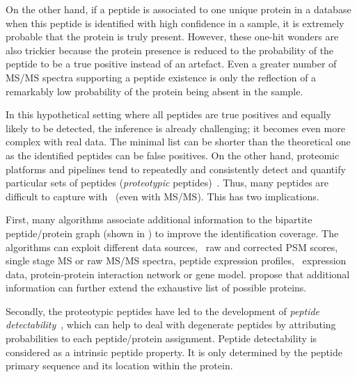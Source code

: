 On the other hand,
if a peptide is associated to one unique protein in a database
when this peptide is identified with high confidence in a sample,
it is extremely probable that the protein is truly present.
However, these one-hit wonders are also trickier because
the protein presence is reduced to
the probability of the peptide to be a true positive instead of an artefact.
Even a greater number of \gls{MS/MS} spectra supporting a peptide existence
is only the reflection of a remarkably low probability of the protein being absent
in the sample.\mybr\

In this hypothetical setting
where all peptides are true positives and equally likely to be detected,
the inference is already challenging;
it becomes even more complex with real data.
The minimal list can be shorter than the theoretical one as
the identified peptides can be false positives.
On the other hand,
proteomic platforms and pipelines tend to
repeatedly and consistently detect and quantify particular sets of peptides
(\emph{proteotypic} peptides)~.
Thus, many peptides are difficult to capture with \ms\ (even with \gls{MS/MS}).
This has two implications.\mybr\

First, many algorithms associate additional information
to the bipartite peptide/protein graph (shown in )
to improve the identification coverage.
The algorithms can exploit different data sources, \eg\ raw and corrected \gls{PSM} scores,
single stage \gls{MS} or raw \gls{MS/MS} spectra,
peptide expression profiles, \mRNA\ expression data,
protein-protein interaction network or gene model.
\citet{Huang2012-nr} propose that additional information can further
extend the exhaustive list of possible proteins.\mybr\

Secondly, the proteotypic peptides have led to
the development of \emph{peptide detectability}~,
which can help to deal with degenerate peptides
by attributing probabilities to each peptide/protein assignment.
Peptide detectability is considered as a intrinsic peptide property.
It is only determined by the peptide primary sequence and
its location within the protein.\mybr\

